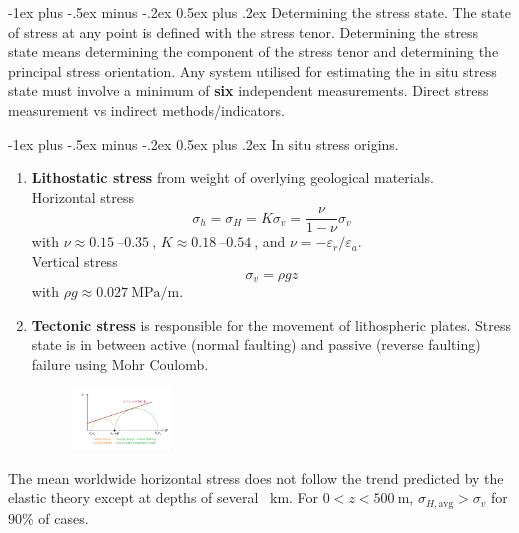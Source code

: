 \documentclass[10pt,landscape,a4paper]{article}
\makeatletter
\renewcommand{\section}{\@startsection{section}{1}{0mm}%
	{-1ex plus -.5ex minus -.2ex}%
	{0.5ex plus .2ex}%
	{\normalfont\large\bfseries}}
\makeatother
\begin{document}
\begin{multicols}{3}
		\section{Determining the stress state.}
		The state of stress at any point is defined with the stress tenor.
		Determining the stress state means determining the component of the stress tenor and determining the principal stress orientation.
		Any system utilised for estimating the in situ stress state must involve a minimum of \textbf{six} independent measurements.
		Direct stress measurement vs indirect methods/indicators.
		
		\section{In situ stress origins.}
		\begin{enumerate}
			\item \textbf{Lithostatic stress} from weight of overlying geological materials.\\
			Horizontal stress
			\[
				\sigma_h=\sigma_H=K\sigma_v=\frac{\nu}{1-\nu}\sigma_v
			\]
			with $\nu\approx\SIrange{0.15}{0.35}{}$, $K\approx\SIrange{0.18}{0.54}{}$, and $\nu=-\varepsilon_r/\varepsilon_a$.\\
			Vertical stress
			\[
				\sigma_v=\rho gz
			\]
			with $\rho g\approx\SI{0.027}{\mega\pascal\per\meter}$.
			\item \textbf{Tectonic stress} is responsible for the movement of lithospheric plates.
			Stress state is in between active (normal faulting) and passive (reverse faulting) failure using Mohr Coulomb.
			\begin{figure}[H]
				\centering
				\includegraphics[width=0.25\textwidth]{tectonic-stress}
			\end{figure}
		\end{enumerate}
		The mean worldwide horizontal stress does not follow the trend predicted by the elastic theory except at depths of several \SI{}{\kilo\meter}. For $0<z<\SI{500}{\meter}$, $\sigma_{H,\text{avg}}>\sigma_v$ for $90\%$ of cases.
		

\end{multicols}
\end{document}
